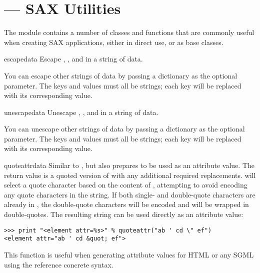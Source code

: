 \section{ ---
         SAX Utilities}




The module  contains a number of classes and
functions that are commonly useful when creating SAX applications,
either in direct use, or as base classes.

\begin{funcdesc}{escape}{data}
  Escape \character{\&}, \character{<}, and \character{>} in a string
  of data.

  You can escape other strings of data by passing a dictionary as the
  optional  parameter.  The keys and values must all be
  strings; each key will be replaced with its corresponding value.
\end{funcdesc}

\begin{funcdesc}{unescape}{data}
  Unescape , , and 
  in a string of data.

  You can unescape other strings of data by passing a dictionary as the
  optional  parameter.  The keys and values must all be
  strings; each key will be replaced with its corresponding value.

\end{funcdesc}

\begin{funcdesc}{quoteattr}{data}
  Similar to , but also prepares  to be
  used as an attribute value.  The return value is a quoted version of
   with any additional required replacements.
   will select a quote character based on the
  content of , attempting to avoid encoding any quote
  characters in the string.  If both single- and double-quote
  characters are already in , the double-quote characters
  will be encoded and  will be wrapped in double-quotes.  The
  resulting string can be used directly as an attribute value:

\begin{verbatim}
>>> print "<element attr=%s>" % quoteattr("ab ' cd \" ef")
<element attr="ab ' cd &quot; ef">
\end{verbatim}

  This function is useful when generating attribute values for HTML or
  any SGML using the reference concrete syntax.
\end{funcdesc}

